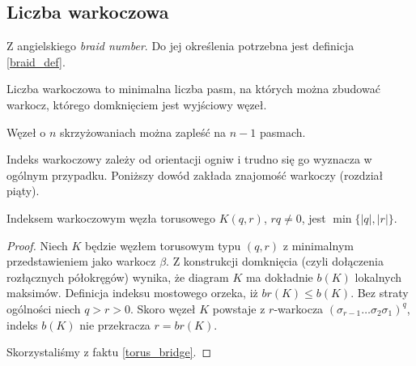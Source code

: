 \subsection{Liczba warkoczowa} %
\label{sub:braid_number}
Z angielskiego \emph{braid number}.
Do jej określenia potrzebna jest definicja \ref{braid_def}.

\begin{definition}
    Liczba warkoczowa to minimalna liczba pasm, na których można zbudować warkocz, którego domknięciem jest wyjściowy węzeł.
\end{definition}

\begin{proposition}
    Węzeł o $n$ skrzyżowaniach można zapleść na $n - 1$ pasmach.
\end{proposition}

Indeks warkoczowy zależy od orientacji ogniw i trudno się go wyznacza w ogólnym przypadku.
Poniższy dowód zakłada znajomość warkoczy (rozdział piąty).

\begin{proposition}
    Indeksem warkoczowym węzła torusowego $K(q, r)$, $rq \neq 0$, jest $\min\{|q|, |r|\}$.
\end{proposition}

\begin{proof}
Niech $K$ będzie węzłem torusowym typu $(q,r)$ z minimalnym przedstawieniem jako warkocz $\beta$.
Z konstrukcji domknięcia (czyli dołączenia rozłącznych półokręgów) wynika, 
że diagram $K$ ma dokładnie $b(K)$ lokalnych maksimów.
Definicja indeksu mostowego orzeka, iż $br(K) \le b(K)$.
Bez straty ogólności niech $q > r > 0$.
Skoro węzeł $K$ powstaje z $r$-warkocza $(\sigma_{r-1} \ldots \sigma_2\sigma_1)^q$, 
indeks $b(K)$ nie przekracza $r = br(K)$.

Skorzystaliśmy z faktu \ref{torus_bridge}.
\end{proof} 


